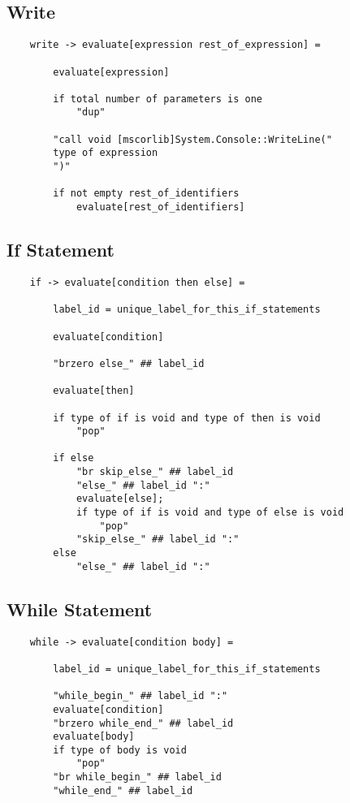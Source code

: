 \documentclass{report}
\begin{document}
\subsection{Write}
\begin{verbatim}
    write -> evaluate[expression rest_of_expression] =

        evaluate[expression]

        if total number of parameters is one
            "dup"

        "call void [mscorlib]System.Console::WriteLine("
        type of expression
        ")"

        if not empty rest_of_identifiers
            evaluate[rest_of_identifiers]
\end{verbatim}

\subsection{If Statement}
\begin{verbatim}
    if -> evaluate[condition then else] =

        label_id = unique_label_for_this_if_statements

        evaluate[condition]

        "brzero else_" ## label_id

        evaluate[then]

        if type of if is void and type of then is void
            "pop"

        if else
            "br skip_else_" ## label_id
            "else_" ## label_id ":"
            evaluate[else];
            if type of if is void and type of else is void
                "pop"
            "skip_else_" ## label_id ":"
        else
            "else_" ## label_id ":"
\end{verbatim}

\subsection{While Statement}
\begin{verbatim}
    while -> evaluate[condition body] =

        label_id = unique_label_for_this_if_statements

        "while_begin_" ## label_id ":"
        evaluate[condition]
        "brzero while_end_" ## label_id
        evaluate[body]
        if type of body is void
            "pop"
        "br while_begin_" ## label_id
        "while_end_" ## label_id
\end{verbatim}
\end{document}
